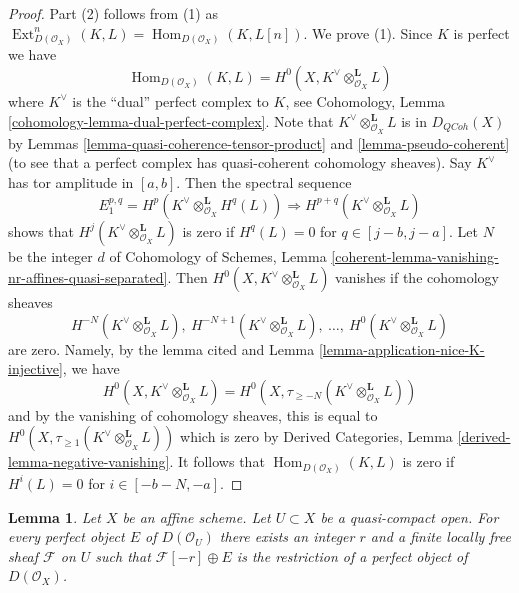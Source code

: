 \documentclass{stacks-project}
\theoremstyle{plain}
\newtheorem{lemma}[subsection]{Lemma}
\theoremstyle{definition}
\theoremstyle{remark}
\numberwithin{equation}{subsection}
\def\Hom{\mathop{\mathrm{Hom}}\nolimits}
\def\Ext{\mathop{\mathrm{Ext}}\nolimits}
\def\QCoh{\mathit{QCoh}}
\begin{document}
\begin{proof}
Part (2) follows from (1) as $\Ext^n_{D(\mathcal{O}_X)}(K, L) =
\Hom_{D(\mathcal{O}_X)}(K, L[n])$. We prove (1).
Since $K$ is perfect we have
$$
\Hom_{D(\mathcal{O}_X)}(K, L) =
H^0(X, K^\vee \otimes_{\mathcal{O}_X}^\mathbf{L} L)
$$
where $K^\vee$ is the ``dual'' perfect complex to $K$, see
Cohomology, Lemma \ref{cohomology-lemma-dual-perfect-complex}.
Note that $K^\vee \otimes_{\mathcal{O}_X}^\mathbf{L} L$
is in $D_\QCoh(X)$ by
Lemmas \ref{lemma-quasi-coherence-tensor-product} and
\ref{lemma-pseudo-coherent} (to see that a perfect complex
has quasi-coherent cohomology sheaves). Say $K^\vee$ has
tor amplitude in $[a, b]$. Then the spectral sequence
$$
E_1^{p, q} = H^p(K^\vee \otimes_{\mathcal{O}_X}^\mathbf{L} H^q(L))
\Rightarrow
H^{p + q}(K^\vee \otimes_{\mathcal{O}_X}^\mathbf{L} L)
$$
shows that $H^j(K^\vee \otimes_{\mathcal{O}_X}^\mathbf{L} L)$
is zero if $H^q(L) = 0$ for $q \in [j - b, j - a]$.
Let $N$ be the integer $d$ of Cohomology of Schemes,
Lemma \ref{coherent-lemma-vanishing-nr-affines-quasi-separated}.
Then $H^0(X, K^\vee \otimes_{\mathcal{O}_X}^\mathbf{L} L)$
vanishes if the cohomology sheaves
$$
H^{-N}(K^\vee \otimes_{\mathcal{O}_X}^\mathbf{L} L),
\ H^{-N + 1}(K^\vee \otimes_{\mathcal{O}_X}^\mathbf{L} L),
\ \ldots,
\ H^0(K^\vee \otimes_{\mathcal{O}_X}^\mathbf{L} L)
$$
are zero. Namely, by the lemma cited and
Lemma \ref{lemma-application-nice-K-injective}, we have
$$
H^0(X, K^\vee \otimes_{\mathcal{O}_X}^\mathbf{L} L) =
H^0(X, \tau_{\geq -N}(K^\vee \otimes_{\mathcal{O}_X}^\mathbf{L} L))
$$
and by the vanishing of cohomology sheaves, this is equal to
$H^0(X, \tau_{\geq 1}(K^\vee \otimes_{\mathcal{O}_X}^\mathbf{L} L))$
which is zero by Derived Categories, Lemma
\ref{derived-lemma-negative-vanishing}.
It follows that $\Hom_{D(\mathcal{O}_X)}(K, L)$ is zero if
$H^i(L) = 0$ for $i \in [-b - N, -a]$.
\end{proof}

\begin{lemma}
\label{lemma-lift-perfect-complex-plus-locally-free}
Let $X$ be an affine scheme. Let $U \subset X$ be a quasi-compact open.
For every perfect object $E$ of $D(\mathcal{O}_U)$ there exists an integer
$r$ and a finite locally free sheaf $\mathcal{F}$ on $U$ such that
$\mathcal{F}[-r] \oplus E$ is the restriction of a perfect object of
$D(\mathcal{O}_X)$.
\end{lemma}
\end{document}
